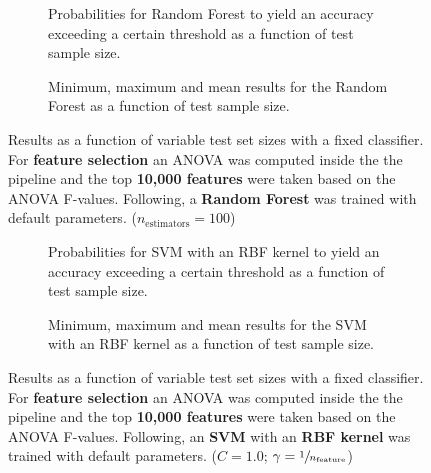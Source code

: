 \begin{figure}
    \captionsetup[subfigure]{justification=justified,singlelinecheck=false}
    \begin{subfigure}[t]{0.61\textwidth}
        
        \caption{Probabilities for Random Forest to yield an accuracy exceeding a certain threshold as a function of test sample size.}
    \end{subfigure}
    \hspace{3.0mm}
    \begin{subfigure}[t]{0.34\textwidth}
        
        \caption{Minimum, maximum and mean results for the Random Forest as a function of test sample size.}
    \end{subfigure}
    \caption[Effects of varying test sample size. Random Forest; Preprocessing: ANOVA feature selection ($k_\text{best} = \num{10000}$)]{Results as a function of variable test set sizes with a fixed classifier. For \textbf{feature selection} an ANOVA was computed inside the the pipeline and the top \textbf{10,000 features} were taken based on the ANOVA F-values. Following, a \textbf{{Random Forest}} was trained with default parameters. ($n_\text{estimators}=\num{100}$)}
    \label{fig:no_PCA_10000_best_selected_RandomForest}
\end{figure}

\begin{figure}
    \captionsetup[subfigure]{justification=justified,singlelinecheck=false}
    \begin{subfigure}[t]{0.61\textwidth}
        
        \caption{Probabilities for SVM with an RBF kernel to yield an accuracy exceeding a certain threshold as a function of test sample size.}
    \end{subfigure}
    \hspace{3.0mm}
    \begin{subfigure}[t]{0.34\textwidth}
        
        \caption{Minimum, maximum and mean results for the SVM with an RBF kernel as a function of test sample size.}
    \end{subfigure}
    \caption[Effects of varying test sample size. SVM (kernel = RBF); Preprocessing: ANOVA feature selection ($k_\text{best} = \num{10000}$)]{Results as a function of variable test set sizes with a fixed classifier. For \textbf{feature selection} an ANOVA was computed inside the the pipeline and the top \textbf{10,000 features} were taken based on the ANOVA F-values. Following, an \textbf{{SVM}} with an \textbf{{RBF kernel}} was trained with default parameters. ($C=\num{1.0}$; $\gamma=\sfrac{1}{n_\text{feature}}$)}
    \label{fig:no_PCA_10000_best_selected_SVC}
\end{figure}

